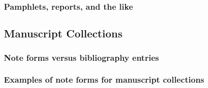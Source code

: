 \documentclass[11pt,letterpaper,oneside]{article}
\begin{document}
\setcounter{subsubsection}{219}
\subsubsection{Pamphlets, reports, and the like}

\begin{citebib}
\item \cite{lifestyles1996}
\item \cite{mcdonalds2014}
\item \cite[¶2,620]{standardtax1996}
\end{citebib}

\setcounter{subsection}{8}
\subsection{Manuscript Collections}
\setcounter{subsection}{14}

\setcounter{subsubsection}{221}
\subsubsection{Note forms versus bibliography entries}
\label{14.222}

\begin{citebib}
\item \cite[Alvin Johnson, memorandum, 1937, file 36,][]{kallen}
\item \cite[Revere's Waste and Memoranda Book (vol. 1, 1761--83; vol. 2,
1783--97),][]{revere}
\end{citebib}

\setcounter{subsubsection}{228}
\subsubsection{Examples of note forms for manuscript collections}
\label{14.229}

\begin{citenobib}
\item \cite[Burton to Merriam, telegram, 26 January 1923, box 26, folder
17,][]{merriam}
\item \cite[Minutes of the Committee for Improving the Condition of the Free
Blacks, Pennsylvania Abolition Society, 1790--1803,][]{pasociety}
\item \cite[Louis Agassiz, report to the Committee of Overseers\ldots
\mkbibbrackets{28 December 1859},][]{overseers}
\item \cite[Gilbert McMicken to Alexander Morris, 29 November 1881, Glasgow
(Scotland), Document 1359, fol. 1r,][MS-12-84]{morris}
\item \cite[Daily Expenses, July 1787, images 7--8,][]{washington}
\item \cite[Minutes, 15 April 1795,][]{pasociety}
\end{citenobib}
\end{document}
